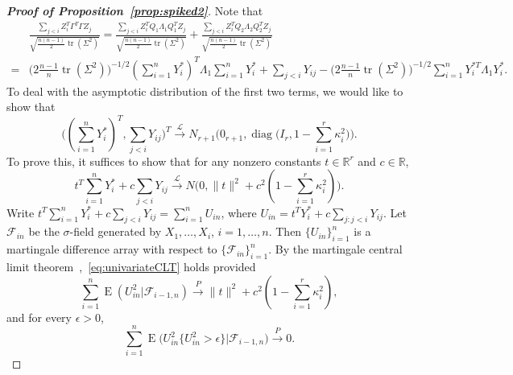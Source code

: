 \documentclass[3p]{elsarticle}
\DeclareMathOperator{\mytr}{tr}
\DeclareMathOperator{\mydiag}{diag}
\DeclareMathOperator{\myE}{E}
\theoremstyle{plain}
\theoremstyle{definition}
\theoremstyle{remark}
\begin{document}
\begin{proof}[\textbf{Proof of Proposition~\ref{prop:spiked2}}]
    Note that
    $$
    \begin{aligned}
        &
    \frac{\sum_{j<i} Z_i^T \Gamma^T \Gamma Z_j }
    {\sqrt{\frac{n(n-1)}{2}\mytr(\Sigma^2)}}
        =
        \frac{\sum_{j<i}Z_i^T Q_1 \Lambda_1 Q_1^T Z_j}
    {\sqrt{\frac{n(n-1)}{2}\mytr(\Sigma^2)}}
        +
        \frac{\sum_{j<i}Z_i^T Q_2 \Lambda_2 Q_2^T Z_j}
    {\sqrt{\frac{n(n-1)}{2}\mytr(\Sigma^2)}}
    \\
        =&
        \big(2\frac{n-1}{n}\mytr(\Sigma^2)\big)^{-1/2}(\sum_{i=1}^n  Y_i^*)^T \Lambda_1 \sum_{i=1}^n  Y_i^*
        +
        \sum_{j<i} Y_{ij}
        -
        \big(2\frac{n-1}{n}\mytr(\Sigma^2)\big)^{-1/2}
        \sum_{i=1}^n Y_i^{*T}\Lambda_1 Y_i^*
        .
    \end{aligned}
    $$
    To deal with the asymptotic distribution of the first two terms, we would like to show that
    \begin{equation}\label{eq:toProveCLT}
        \big(
        (\sum_{i=1}^n Y_i^*)^T,
        \sum_{j<i} Y_{ij}
        \big)^T
    \xrightarrow{\mathcal{L}} N_{r+1}\Big(0_{r+1}, \mydiag \big(I_{r},1-\sum_{i=1}^r \kappa_i^2\big)\Big).
\end{equation}
    To prove this, it suffices to show that for any nonzero constants $t\in\mathbb{R}^r$ and $c\in\mathbb{R}$,
    \begin{equation}\label{eq:univariateCLT}
        t^T \sum_{i=1}^n Y_i^* +c \sum_{j<i} Y_{ij}
        \xrightarrow{\mathcal{L}}N\big(0,\|t\|^2+c^2(1-\sum_{i=1}^r \kappa_i^2)\big).
    \end{equation}
    Write $t^T \sum_{i=1}^n Y_i^*+c \sum_{j<i}Y_{ij} =\sum_{i=1}^n U_{in}$,
    where 
    $U_{in}=
    t^T Y_i^*+c  \sum_{j: j<i}Y_{ij}
    $.
    Let $\mathcal{F}_{in}$ be the $\sigma$-field generated by $X_1,\dots, X_i$, $i=1,\ldots,n$.
    Then $\{U_{in}\}_{i=1}^n$ is a martingale difference array with respect to $\{\mathcal{F}_{in}\}_{i=1}^n$.
    By the martingale central limit theorem~\citep[Chapter VIII, Theorem 1]{pollard1984convergence},~\eqref{eq:univariateCLT} holds provided
     \begin{equation}\label{eq:MCLTcondition1}
         \sum_{i=1}^n \myE(U_{in}^2 |\mathcal{F}_{i-1,n})\xrightarrow{P} \|t\|^2 + c^2(1-\sum_{i=1}^r \kappa_i^2),
     \end{equation}
     and for every $\epsilon>0$,
     \begin{equation}\label{eq:MCLTcondition2}
         \sum_{i=1}^n \myE\big(U_{in}^2\big\{U_{in}^2>\epsilon \big\}\big|\mathcal{F}_{i-1,n}\big)\xrightarrow{P} 0.

\end{equation}
\end{proof}
\end{document}
